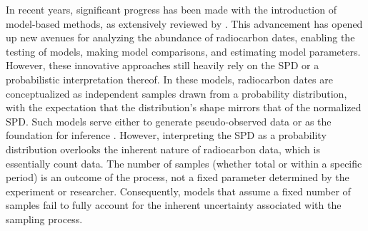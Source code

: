 \documentclass[a4paper]{article}
\begin{document}
In recent years, significant progress has been made with the introduction of model-based methods, as extensively reviewed by \textcite{Crema2022}. This advancement has opened up new avenues for analyzing the abundance of radiocarbon dates, enabling the testing of models, making model comparisons, and estimating model parameters. However, these innovative approaches still heavily rely on the SPD or a probabilistic interpretation thereof. In these models, radiocarbon dates are conceptualized as independent samples drawn from a probability distribution, with the expectation that the distribution's shape mirrors that of the normalized SPD. Such models serve either to generate pseudo-observed data or as the foundation for inference \parencite{Porcic2020, Carleton2021b, Crema2021b, Timpson2020}. However, interpreting the SPD as a probability distribution overlooks the inherent nature of radiocarbon data, which is essentially count data. The number of samples (whether total or within a specific period) is an outcome of the process, not a fixed parameter determined by the experiment or researcher. Consequently, models that assume a fixed number of samples fail to fully account for the inherent uncertainty associated with the sampling process.
\\
 

\end{document}

